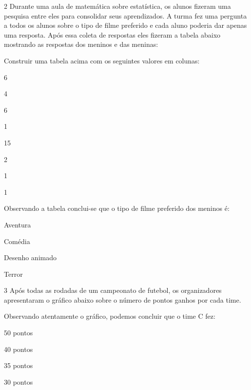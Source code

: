 
\num{2} Durante uma aula de matemática sobre estatística, os alunos fizeram
uma pesquisa entre eles para consolidar seus aprendizados. A turma fez
uma pergunta a todos os alunos sobre o tipo de filme preferido e cada
aluno poderia dar apenas uma resposta. Após essa coleta de respostas
eles fizeram a tabela abaixo mostrando as respostas dos meninos e das
meninas:


Construir uma tabela acima com os seguintes valores em colunas:

\begin{multicols}{2}
6

4

6

1

\columnbreak

 15

 2

 1

 1
\end{multicols} 

Observando a tabela conclui-se que o tipo de filme preferido dos meninos
é:

\begin{escolha}
\item
  Aventura
\item
  Comédia
\item
  Desenho animado
\item
  Terror
\end{escolha}


\num{3} Após todas as rodadas de um campeonato de futebol, os organizadores
apresentaram o gráfico abaixo sobre o número de pontos ganhos por cada
time.


Observando atentamente o gráfico, podemos concluir que o time C fez:

\begin{escolha}
\item
  50 pontos
\item
  40 pontos
\item
  35 pontos
\item
  30 pontos
\end{escolha}


